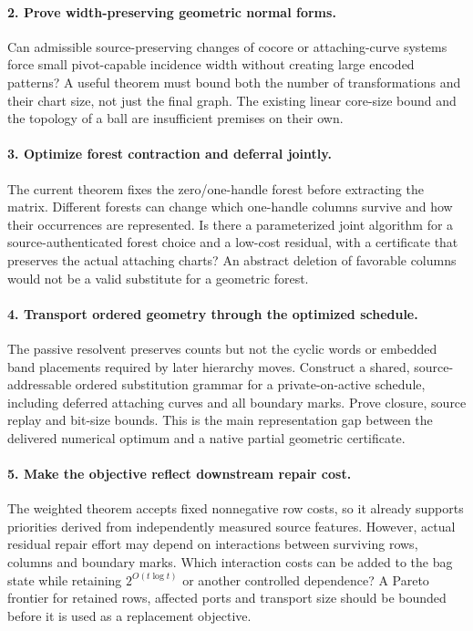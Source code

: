 \documentclass[11pt]{article}
\theoremstyle{definition}\newtheorem{definition}[theorem]{Definition}
\theoremstyle{remark}\newtheorem{remark}[theorem]{Remark}
\begin{document}
\paragraph{2. Prove width-preserving geometric normal forms.}
Can admissible source-preserving changes of cocore or attaching-curve systems force small pivot-capable incidence width without creating large encoded patterns? A useful theorem must bound both the number of transformations and their chart size, not just the final graph. The existing linear core-size bound and the topology of a ball are insufficient premises on their own.

\paragraph{3. Optimize forest contraction and deferral jointly.}
The current theorem fixes the zero/one-handle forest before extracting the matrix. Different forests can change which one-handle columns survive and how their occurrences are represented. Is there a parameterized joint algorithm for a source-authenticated forest choice and a low-cost residual, with a certificate that preserves the actual attaching charts? An abstract deletion of favorable columns would not be a valid substitute for a geometric forest.

\paragraph{4. Transport ordered geometry through the optimized schedule.}
The passive resolvent preserves counts but not the cyclic words or embedded band placements required by later hierarchy moves. Construct a shared, source-addressable ordered substitution grammar for a private-on-active schedule, including deferred attaching curves and all boundary marks. Prove closure, source replay and bit-size bounds. This is the main representation gap between the delivered numerical optimum and a native partial geometric certificate.

\paragraph{5. Make the objective reflect downstream repair cost.}
The weighted theorem accepts fixed nonnegative row costs, so it already supports priorities derived from independently measured source features. However, actual residual repair effort may depend on interactions between surviving rows, columns and boundary marks. Which interaction costs can be added to the bag state while retaining $2^{O(t\log t)}$ or another controlled dependence? A Pareto frontier for retained rows, affected ports and transport size should be bounded before it is used as a replacement objective.
\end{document}
